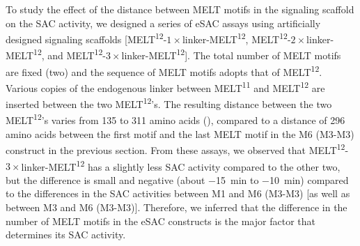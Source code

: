 To study the effect of the distance between MELT motifs in the signaling scaffold on the SAC activity, we designed a series of eSAC assays using artificially designed signaling scaffolds [MELT\textsuperscript{12}-$1\times$linker-MELT\textsuperscript{12}, MELT\textsuperscript{12}-$2\times$linker-MELT\textsuperscript{12}, and MELT\textsuperscript{12}-$3\times$linker-MELT\textsuperscript{12}]. The total number of MELT motifs are fixed (two) and the sequence of MELT motifs adopts that of MELT\textsuperscript{12}. Various copies of the endogenous linker between MELT\textsuperscript{11} and MELT\textsuperscript{12} are inserted between the two MELT\textsuperscript{12}'s. The resulting distance between the two MELT\textsuperscript{12}'s varies from 135 to 311 amino acids (), compared to a distance of 296 amino acids between the first motif and the last MELT motif in the M6 (M3-M3) construct in the previous section. From these assays, we observed that MELT\textsuperscript{12}-$3\times$linker-MELT\textsuperscript{12} has a slightly less SAC activity compared to the other two, but the difference is small and negative (about \SI{-15}{min} to \SI{-10}{min}) compared to the differences in the SAC activities between M1 and M6 (M3-M3) [as well as between M3 and M6 (M3-M3)]. Therefore, we inferred that the difference in the number of MELT motifs in the eSAC constructs is the major factor that determines its SAC activity.

